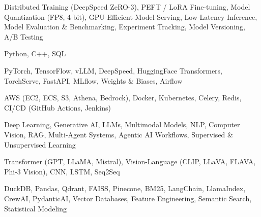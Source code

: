\documentclass[letter,10pt]{article}
\begin{document}
 Distributed Training (DeepSpeed ZeRO-3), PEFT / LoRA Fine-tuning, Model Quantization (FP8, 4-bit), GPU-Efficient Model Serving, Low-Latency Inference, Model Evaluation \& Benchmarking, Experiment Tracking, Model Versioning, A/B Testing\par\vspace{2pt}

 Python, C++, SQL\par\vspace{2pt}

 PyTorch, TensorFlow, vLLM, DeepSpeed, HuggingFace Transformers, TorchServe, FastAPI, MLflow, Weights \& Biases, Airflow\par\vspace{2pt}

 AWS (EC2, ECS, S3, Athena, Bedrock), Docker, Kubernetes, Celery, Redis, CI/CD (GitHub Actions, Jenkins)\par\vspace{2pt}

 Deep Learning, Generative AI, LLMs, Multimodal Models, NLP, Computer Vision, RAG, Multi-Agent Systems, Agentic AI Workflows, Supervised \& Unsupervised Learning\par\vspace{2pt}

 Transformer (GPT, LLaMA, Mistral), Vision-Language (CLIP, LLaVA, FLAVA, Phi-3 Vision), CNN, LSTM, Seq2Seq\par\vspace{2pt}

 DuckDB, Pandas, Qdrant, FAISS, Pinecone, BM25, LangChain, LlamaIndex, CrewAI, PydanticAI, Vector Databases, Feature Engineering, Semantic Search, Statistical Modeling
\end{document}
